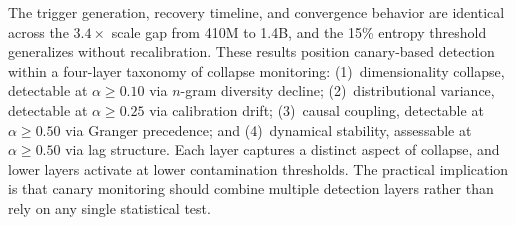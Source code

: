 The trigger generation, recovery timeline, and convergence behavior are identical across the $3.4\times$ scale gap from 410M to 1.4B, and the 15\% entropy threshold generalizes without recalibration.
These results position canary-based detection within a four-layer taxonomy of collapse monitoring: (1)~dimensionality collapse, detectable at $\alpha \geq 0.10$ via $n$-gram diversity decline; (2)~distributional variance, detectable at $\alpha \geq 0.25$ via calibration drift; (3)~causal coupling, detectable at $\alpha \geq 0.50$ via Granger precedence; and (4)~dynamical stability, assessable at $\alpha \geq 0.50$ via lag structure.
Each layer captures a distinct aspect of collapse, and lower layers activate at lower contamination thresholds.
The practical implication is that canary monitoring should combine multiple detection layers rather than rely on any single statistical test.

